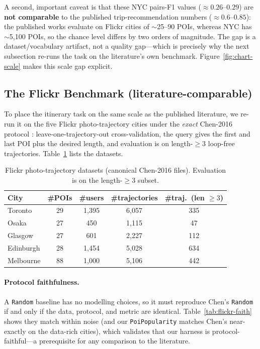 A second, important caveat is that these NYC pairs-F1 values ($\approx0.26$--$0.29$) are
\textbf{not comparable} to the published trip-recommendation numbers ($\approx0.6$--$0.85$):
the published works evaluate on Flickr cities of $\sim$25--90 POIs, whereas NYC has $\sim$5{,}100
POIs, so the chance level differs by two orders of magnitude. The gap is a dataset/vocabulary
artifact, not a quality gap---which is precisely why the next subsection re-runs the task on the
literature's own benchmark. Figure~\ref{fig:chart-scale} makes this scale gap explicit.



\subsection{The Flickr Benchmark (literature-comparable)}
\label{sec:sol-results-flickr}

To place the itinerary task on the same scale as the published literature, we re-run it on the
five Flickr photo-trajectory cities under the \emph{exact} Chen-2016 protocol
\cite{chen2016learning}: leave-one-trajectory-out cross-validation, the query gives the first
and last POI plus the desired length, and evaluation is on length-$\ge\!3$ loop-free
trajectories. Table~\ref{tab:flickr-data} lists the datasets.

\begin{table}[ht]
\centering
\caption{Flickr photo-trajectory datasets (canonical Chen-2016 files). Evaluation is on the
length-$\ge\!3$ subset.}
\label{tab:flickr-data}
\begin{tabular}{lcccc}
\toprule
City & \#POIs & \#users & \#trajectories & \#traj.\ (len $\ge 3$) \\
\midrule
Toronto   & 29 & 1{,}395 & 6{,}057 & 335 \\
Osaka     & 27 &   450 & 1{,}115 &  47 \\
Glasgow   & 27 &   601 & 2{,}227 & 112 \\
Edinburgh & 28 & 1{,}454 & 5{,}028 & 634 \\
Melbourne & 88 & 1{,}000 & 5{,}106 & 442 \\
\bottomrule
\end{tabular}
\end{table}

\paragraph{Protocol faithfulness.} A \texttt{Random} baseline has no modelling choices, so it
must reproduce Chen's \texttt{Random} if and only if the data, protocol, and metric are
identical. Table~\ref{tab:flickr-faith} shows they match within noise (and our
\texttt{PoiPopularity} matches Chen's near-exactly on the data-rich cities), which validates
that our harness is protocol-faithful---a prerequisite for any comparison to the literature.

